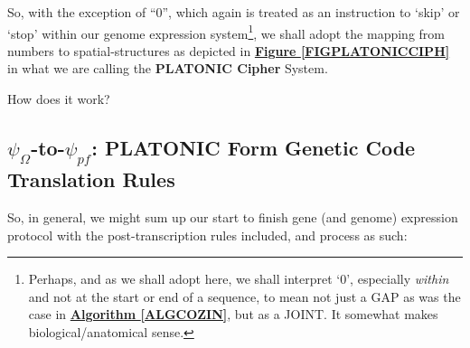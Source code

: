 \documentclass[a4paper, 18pt]{book} %
\begin{document}
So, with the exception of ``0'', which again is treated as an instruction to `skip' or `stop' within our genome expression system\footnote{Perhaps, and as we shall adopt here, we shall interpret `0', especially \textit{within} and not at the start or end of a sequence, to mean not just a GAP as was the case in \textbf{\hyperref[ALGCOZIN]{Algorithm \ref{ALGCOZIN}}}, but as a JOINT. It somewhat makes biological/anatomical sense.}, we shall adopt the mapping from numbers to spatial-structures as depicted in \textbf{\hyperref[FIGPLATONICCIPH]{Figure \ref{FIGPLATONICCIPH}}} in what we are calling the \textbf{PLATONIC Cipher} System\cite{lutalo_2025_platonic}.


How does it work?

\subsection{$\psi_{\Omega}$-to-$\psi_{pf}$: PLATONIC Form Genetic Code Translation Rules}
\label{SECGENSEQEXPRES}


So, in general, we might sum up our start to finish gene (and genome) expression protocol with the post-transcription rules included, and process as such:
\end{document}
